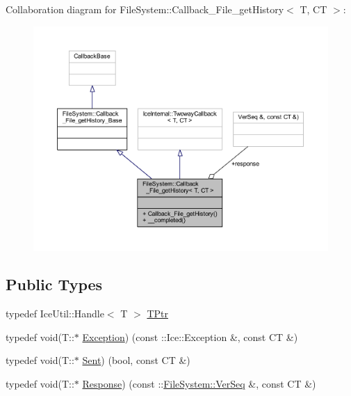 Collaboration diagram for File\+System\+:\+:Callback\+\_\+\+File\+\_\+get\+History$<$ T, C\+T $>$\+:
\nopagebreak
\begin{figure}[H]
\begin{center}
\leavevmode
\includegraphics[width=350pt]{class_file_system_1_1_callback___file__get_history__coll__graph}
\end{center}
\end{figure}
\subsection*{Public Types}
\begin{DoxyCompactItemize}
\item 
typedef Ice\+Util\+::\+Handle$<$ T $>$ \hyperlink{class_file_system_1_1_callback___file__get_history_aafd5b2465ab25e9e58402d052d89de42}{T\+Ptr}
\item 
typedef void(T\+::$\ast$ \hyperlink{class_file_system_1_1_callback___file__get_history_a06ee015626144ae9e9b6c7da881698fb}{Exception}) (const \+::Ice\+::\+Exception \&, const C\+T \&)
\item 
typedef void(T\+::$\ast$ \hyperlink{class_file_system_1_1_callback___file__get_history_a9fc8d5d98e242cd24719b4d9727c75cf}{Sent}) (bool, const C\+T \&)
\item 
typedef void(T\+::$\ast$ \hyperlink{class_file_system_1_1_callback___file__get_history_ab5a3b64e414e7c291f6b17ecadecd1db}{Response}) (const \+::\hyperlink{namespace_file_system_ac32dc1eb34c060160b52edc7c4e37d6e}{File\+System\+::\+Ver\+Seq} \&, const C\+T \&)
\end{DoxyCompactItemize}
